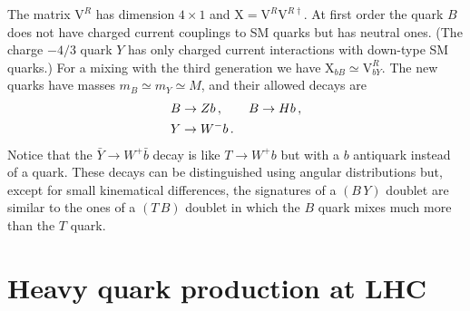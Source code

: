 \documentclass[12pt,a4paper]{article}
\newcommand{\TB}{(T \, B)}
\newcommand{\BY}{(B \, Y)}
\begin{document}
The matrix $\mathrm{V}^R$ has dimension $4\times 1$ and $\mathrm{X} = \mathrm{V}^R \mathrm{V}^{R\dagger}$. At first order the quark $B$ does not have charged current couplings to SM quarks but has neutral ones.
(The charge $-4/3$ quark $Y$ has only charged current interactions with down-type SM quarks.)
For a mixing with the third generation we have $\mathrm{X}_{bB} \simeq \mathrm{V}_{bY}^R$.
The new quarks have masses $m_B \simeq m_Y \simeq M$, and their allowed decays are
\begin{align}
& B \to Zb \,,\quad \quad B \to Hb \,, \notag \\ 
& Y \to W^- b \,.
\end{align}
Notice that the $\bar Y \to W^+ \bar b$ decay is like $T \to W^+ b$ but with a $b$ antiquark instead of a quark. These decays can be distinguished using angular distributions but, except for small kinematical differences, the signatures of a $\BY$ doublet are similar to the ones of a $\TB$ doublet in which the $B$ quark mixes much more than the $T$ quark.

\section{Heavy quark production at LHC}
\label{sec:3}
\end{document}

